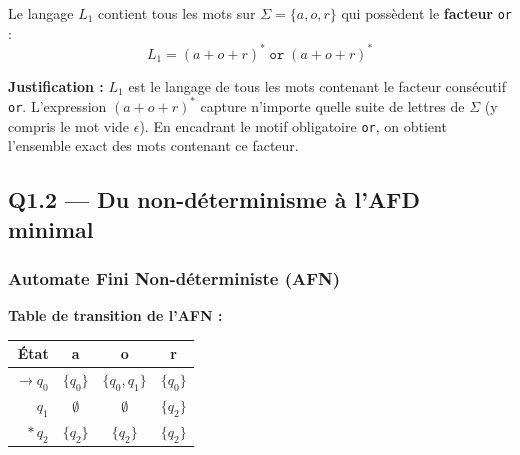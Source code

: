 \documentclass[12pt,a4paper,oneside]{scrartcl}
\begin{document}
\begin{definitionbox}
Le langage $L_1$ contient tous les mots sur $\Sigma = \{a, o, r\}$ qui possèdent le \textbf{facteur} \texttt{or} :
$$\boxed{L_1 = (a+o+r)^*\;\texttt{or}\;(a+o+r)^*}$$
\end{definitionbox}

\textbf{Justification :}
$L_1$ est le langage de tous les mots contenant le facteur consécutif \texttt{or}. L'expression $(a+o+r)^*$ capture n'importe quelle suite de lettres de $\Sigma$ (y compris le mot vide $\epsilon$). En encadrant le motif obligatoire \texttt{or}, on obtient l'ensemble exact des mots contenant ce facteur.

\subsection{Q1.2 — Du non-déterminisme à l'AFD minimal}

\subsubsection*{Automate Fini Non-déterministe (AFN)}

\begin{center}
\end{center}

\textbf{Table de transition de l'AFN :}
\begin{center}
\begin{tabular}{r ccc}
    \toprule
    \textbf{État} & \textbf{a} & \textbf{o} & \textbf{r} \\
    \midrule
    $\to q_0$ & $\{q_0\}$ & $\{q_0, q_1\}$ & $\{q_0\}$ \\
    $q_1$ & $\emptyset$ & $\emptyset$ & $\{q_2\}$ \\
    $*\, q_2$ & $\{q_2\}$ & $\{q_2\}$ & $\{q_2\}$ \\
    \bottomrule
\end{tabular}
\end{center}
\end{document}
